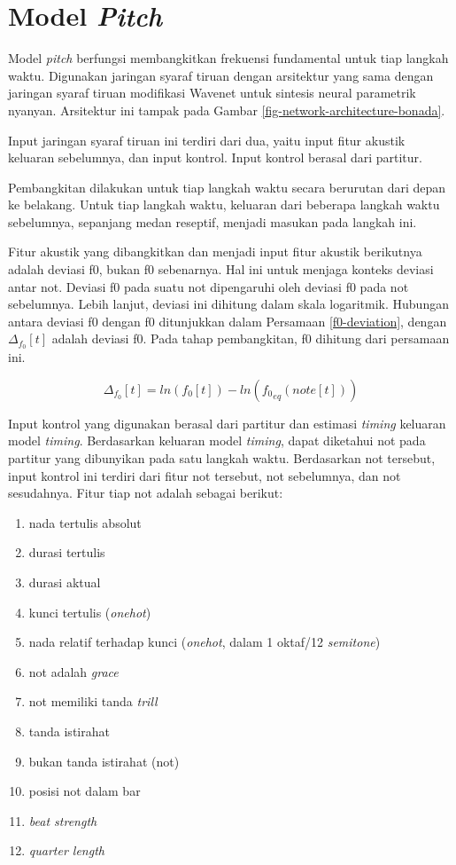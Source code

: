 \section{Model \textit{Pitch}}

Model \textit{pitch} berfungsi membangkitkan frekuensi fundamental untuk tiap langkah waktu. Digunakan jaringan syaraf tiruan dengan arsitektur yang sama dengan jaringan syaraf tiruan modifikasi Wavenet untuk sintesis neural parametrik nyanyan. Arsitektur ini tampak pada Gambar \ref{fig-network-architecture-bonada}.

Input jaringan syaraf tiruan ini terdiri dari dua, yaitu input fitur akustik keluaran sebelumnya, dan input kontrol. Input kontrol berasal dari partitur.

Pembangkitan dilakukan untuk tiap langkah waktu secara berurutan dari depan ke belakang. Untuk tiap langkah waktu, keluaran dari beberapa langkah waktu sebelumnya, sepanjang medan reseptif, menjadi masukan pada langkah ini.

Fitur akustik yang dibangkitkan dan menjadi input fitur akustik berikutnya adalah deviasi f0, bukan f0 sebenarnya. Hal ini untuk menjaga konteks deviasi antar not. Deviasi f0 pada suatu not dipengaruhi oleh deviasi f0 pada not sebelumnya. Lebih lanjut, deviasi ini dihitung dalam skala logaritmik. Hubungan antara deviasi f0 dengan f0 ditunjukkan dalam Persamaan \ref{f0-deviation}, dengan $\Delta_{f_0}[t]$ adalah deviasi f0. Pada tahap pembangkitan, f0 dihitung dari persamaan ini.

\begin{equation}
    \Delta_{f_0}[t] = ln(f_0[t]) - ln({f_0}_{eq}(note[t]))
\end{equation}\label{f0-deviation}

Input kontrol yang digunakan berasal dari partitur dan estimasi \textit{timing} keluaran model \textit{timing}. Berdasarkan keluaran model \textit{timing}, dapat diketahui not pada partitur yang dibunyikan pada satu langkah waktu. Berdasarkan not tersebut, input kontrol ini terdiri dari fitur not tersebut, not sebelumnya, dan not sesudahnya. Fitur tiap not adalah sebagai berikut:

\begin{enumerate}
  \item nada tertulis absolut 
  \item durasi tertulis
  \item durasi aktual
  \item kunci tertulis (\textit{onehot})
  \item nada relatif terhadap kunci (\textit{onehot}, dalam 1 oktaf/12 \textit{semitone})
  \item not adalah \textit{grace}
  \item not memiliki tanda \textit{trill}
  \item tanda istirahat
  \item bukan tanda istirahat (not)
  \item posisi not dalam bar
  \item \textit{beat strength}
  \item \textit{quarter length}
\end{enumerate}


